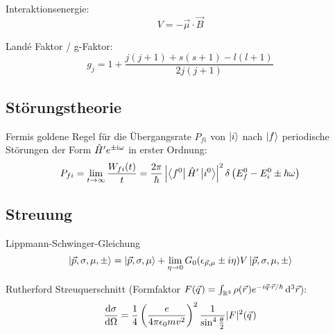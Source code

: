 			Interaktionsenergie:
			\begin{equation}
				V = -\vec{\mu} \cdot \vec{B}
			\end{equation}

			Landé Faktor / g-Faktor:
			\begin{equation}
				g_j = 1+\frac{j(j+1) + s(s+1) - l(l+1)}{2j(j+1)}
			\end{equation}


	\subsection{Störungstheorie}
		\noindent
		Fermis goldene Regel für die Übergangsrate $P_{fi}$ von $\Ket{i}$ nach $\Ket{f}$ periodische Störungen der Form $\hat{H}' e^{\pm\mathrm{i}\omega}$ in erster Ordnung:
		\begin{equation}
			P_{fi} = \lim_{t\rightarrow\infty} \frac{W_{fi}(t)}{t} = \frac{2\pi}{\hbar} \left| \Bra{f^0}\hat{H}'\Ket{i^0} \right|^2 \delta\left( E_f^0 - E_i^0 \pm \hbar\omega \right)
		\end{equation}


	\subsection{Streuung}
		\noindent
		Lippmann-Schwinger-Gleichung
		\begin{equation}
			\Ket{\vec{p},\sigma,\mu,\pm} = \Ket{\vec{p}, \sigma, \mu} + \lim_{\eta\rightarrow 0} G_0(\epsilon_{\vec{p},\mu}\pm i\eta) V \Ket{\vec{p},\sigma,\mu,\pm}
		\end{equation}

		Rutherford Streuquerschnitt (Formfaktor $F(\pvec{q}) = \int_{\mathbb{R}^3} \rho(\pvec{r}) e^{-i \vec{q}\cdot\vec{r}/\hbar}\, \diff^3 \vec{r} $):
		\begin{equation}
			\tder{\sigma}{\Omega} = \frac{1}{4} \Br{\frac{e}{4\pi\epsilon_0 m v^2}}^2
			\frac{1}{\sin^4\frac{\theta}{2}} \vbr{F}^2(\pvec{q})
		\end{equation}
